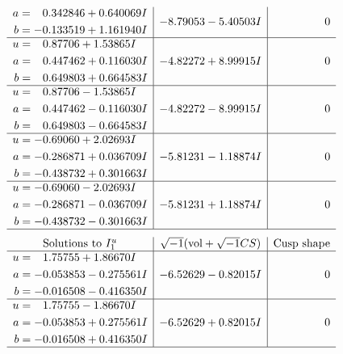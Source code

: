 \documentclass[1p]{elsarticle_modified}
\theoremstyle{definition}
\newcommand{\I}{\sqrt{-1}}
\begin{document}
$$\begin{array}{c|c|c}
\begin{aligned}
a &= \phantom{-}0.342846 + 0.640069 I \\
b &= -0.133519 + 1.161940 I\end{aligned}
 & -8.79053 - 5.40503 I & \phantom{-0.000000 } 0 \\ \hline\begin{aligned}
u &= \phantom{-}0.87706 + 1.53865 I \\
a &= \phantom{-}0.447462 + 0.116030 I \\
b &= \phantom{-}0.649803 + 0.664583 I\end{aligned}
 & -4.82272 + 8.99915 I & \phantom{-0.000000 } 0 \\ \hline\begin{aligned}
u &= \phantom{-}0.87706 - 1.53865 I \\
a &= \phantom{-}0.447462 - 0.116030 I \\
b &= \phantom{-}0.649803 - 0.664583 I\end{aligned}
 & -4.82272 - 8.99915 I & \phantom{-0.000000 } 0 \\ \hline\begin{aligned}
u &= -0.69060 + 2.02693 I \\
a &= -0.286871 + 0.036709 I \\
b &= -0.438732 + 0.301663 I\end{aligned}
 & -5.81231 - 1.18874 I & \phantom{-0.000000 } 0 \\ \hline\begin{aligned}
u &= -0.69060 - 2.02693 I \\
a &= -0.286871 - 0.036709 I \\
b &= -0.438732 - 0.301663 I\end{aligned}
 & -5.81231 + 1.18874 I & \phantom{-0.000000 } 0\\
 \hline 
 \end{array}$$\newpage$$\begin{array}{c|c|c}  
\text{Solutions to }I^u_{1}& \I (\text{vol} + \sqrt{-1}CS) & \text{Cusp shape}\\
 \hline 
\begin{aligned}
u &= \phantom{-}1.75755 + 1.86670 I \\
a &= -0.053853 - 0.275561 I \\
b &= -0.016508 - 0.416350 I\end{aligned}
 & -6.52629 - 0.82015 I & \phantom{-0.000000 } 0 \\ \hline\begin{aligned}
u &= \phantom{-}1.75755 - 1.86670 I \\
a &= -0.053853 + 0.275561 I \\
b &= -0.016508 + 0.416350 I\end{aligned}
 & -6.52629 + 0.82015 I & \phantom{-0.000000 } 0\\
 \hline 
 \end{array}$$\newpage\newpage\renewcommand{\arraystretch}{1}
\end{document}
